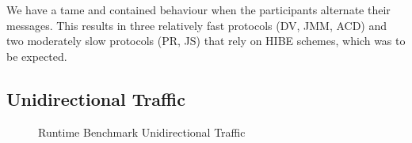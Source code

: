 \documentclass[11pt,a4paper,twoside,openright,bibliography=totoc]{scrbook}
\begin{document}
We have a tame and contained behaviour when the participants
alternate their messages. This results in three relatively fast
protocols (DV, JMM, ACD) and two moderately slow protocols
(PR, JS) that rely on HIBE schemes, which was to be
expected.

\clearpage

\subsection{Unidirectional Traffic}
\label{sec:unid-traff}

\begin{figure}[H]
  \centering
   
  \caption{Runtime Benchmark Unidirectional Traffic}
  \label{fig:time-uni}
\end{figure}
\end{document}
